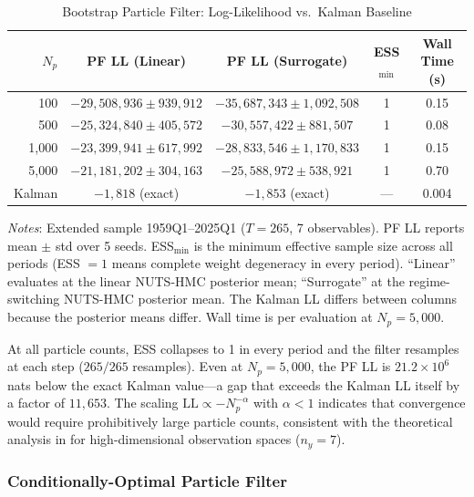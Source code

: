 \documentclass[12pt]{article}
\theoremstyle{plain}
\theoremstyle{definition}
\theoremstyle{remark}
\newcommand{\tablenotes}[1]{%
  \par\vspace{0.5em}%
  \noindent\begin{minipage}{\textwidth}%
  \raggedright\footnotesize #1%
  \end{minipage}\par%
}
\begin{document}
\begin{table}[htbp]
\centering
\caption{Bootstrap Particle Filter: Log-Likelihood vs.\ Kalman Baseline}
\label{tab:pf_benchmark}
\begin{tabular}{rcccc}
\toprule
$N_p$ & PF LL (Linear) & PF LL (Surrogate) & ESS$_{\min}$ & Wall Time (s) \\
\midrule
100    & $-29{,}508{,}936 \pm 939{,}912$ & $-35{,}687{,}343 \pm 1{,}092{,}508$ & 1 & 0.15 \\
500    & $-25{,}324{,}840 \pm 405{,}572$ & $-30{,}557{,}422 \pm 881{,}507$   & 1 & 0.08 \\
1{,}000 & $-23{,}399{,}941 \pm 617{,}992$ & $-28{,}833{,}546 \pm 1{,}170{,}833$ & 1 & 0.15 \\
5{,}000 & $-21{,}181{,}202 \pm 304{,}163$ & $-25{,}588{,}972 \pm 538{,}921$   & 1 & 0.70 \\
\midrule
Kalman & $-1{,}818$ (exact) & $-1{,}853$ (exact) & --- & 0.004 \\
\bottomrule
\end{tabular}
\smallskip
\tablenotes{\textit{Notes}: Extended sample 1959Q1--2025Q1 ($T=265$, 7 observables). PF LL reports mean $\pm$ std over 5 seeds. ESS$_{\min}$ is the minimum effective sample size across all periods (ESS $=1$ means complete weight degeneracy in every period). ``Linear'' evaluates at the linear NUTS-HMC posterior mean; ``Surrogate'' at the regime-switching NUTS-HMC posterior mean. The Kalman LL differs between columns because the posterior means differ. Wall time is per evaluation at $N_p = 5{,}000$.}
\end{table}

At all particle counts, ESS collapses to 1 in every period and the filter resamples at each step ($265/265$ resamples). Even at $N_p = 5{,}000$, the PF LL is $21.2 \times 10^6$ nats below the exact Kalman value---a gap that exceeds the Kalman LL itself by a factor of $11{,}653$. The scaling $\text{LL} \propto -N_p^{-\alpha}$ with $\alpha < 1$ indicates that convergence would require prohibitively large particle counts, consistent with the theoretical analysis in \citet{snyder2008obstacles} for high-dimensional observation spaces ($n_y = 7$).

\subsubsection{Conditionally-Optimal Particle Filter}
\end{document}
